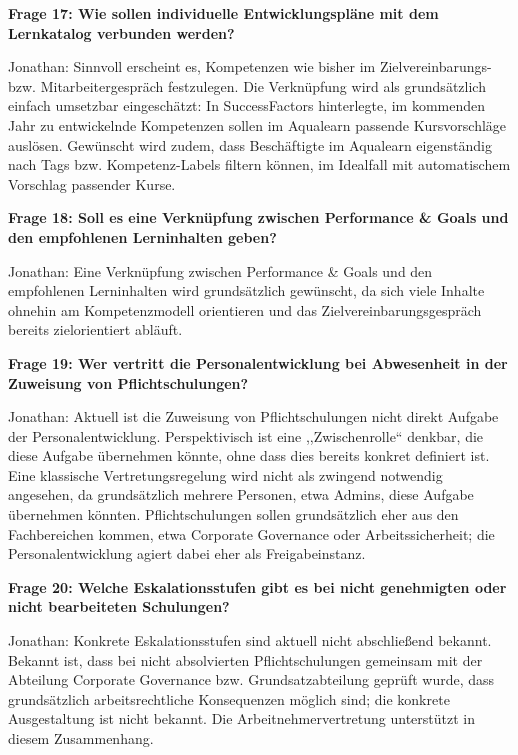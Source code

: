 \documentclass[
    12pt, 
    a4paper,
    ]{scrartcl} %
\begin{document}
\medskip
\textbf{Frage 17: Wie sollen individuelle Entwicklungspl\"ane mit dem Lernkatalog verbunden werden?}

Jonathan: Sinnvoll erscheint es, Kompetenzen wie bisher im Zielvereinbarungs- bzw. Mitarbeitergespr\"ach festzulegen. Die Verkn\"upfung wird als grunds\"atzlich einfach umsetzbar eingesch\"atzt: In SuccessFactors hinterlegte, im kommenden Jahr zu entwickelnde Kompetenzen sollen im Aqualearn passende Kursvorschl\"age ausl\"osen. Gew\"unscht wird zudem, dass Besch\"aftigte im Aqualearn eigenst\"andig nach Tags bzw. Kompetenz-Labels filtern k\"onnen, im Idealfall mit automatischem Vorschlag passender Kurse.

\medskip
\textbf{Frage 18: Soll es eine Verkn\"upfung zwischen Performance \& Goals und den empfohlenen Lerninhalten geben?}

Jonathan: Eine Verkn\"upfung zwischen Performance \& Goals und den empfohlenen Lerninhalten wird grunds\"atzlich gew\"unscht, da sich viele Inhalte ohnehin am Kompetenzmodell orientieren und das Zielvereinbarungsgespr\"ach bereits zielorientiert abl\"auft.

\bigskip
{}

\textbf{Frage 19: Wer vertritt die Personalentwicklung bei Abwesenheit in der Zuweisung von Pflichtschulungen?}

Jonathan: Aktuell ist die Zuweisung von Pflichtschulungen nicht direkt Aufgabe der Personalentwicklung. Perspektivisch ist eine ,,Zwischenrolle`` denkbar, die diese Aufgabe \"ubernehmen k\"onnte, ohne dass dies bereits konkret definiert ist. Eine klassische Vertretungsregelung wird nicht als zwingend notwendig angesehen, da grunds\"atzlich mehrere Personen, etwa Admins, diese Aufgabe \"ubernehmen k\"onnten. Pflichtschulungen sollen grunds\"atzlich eher aus den Fachbereichen kommen, etwa Corporate Governance oder Arbeitssicherheit; die Personalentwicklung agiert dabei eher als Freigabeinstanz.

\medskip
\textbf{Frage 20: Welche Eskalationsstufen gibt es bei nicht genehmigten oder nicht bearbeiteten Schulungen?}

Jonathan: Konkrete Eskalationsstufen sind aktuell nicht abschlie{\ss}end bekannt. Bekannt ist, dass bei nicht absolvierten Pflichtschulungen gemeinsam mit der Abteilung Corporate Governance bzw. Grundsatzabteilung gepr\"uft wurde, dass grunds\"atzlich arbeitsrechtliche Konsequenzen m\"oglich sind; die konkrete Ausgestaltung ist nicht bekannt. Die Arbeitnehmervertretung unterst\"utzt in diesem Zusammenhang.
\end{document}
